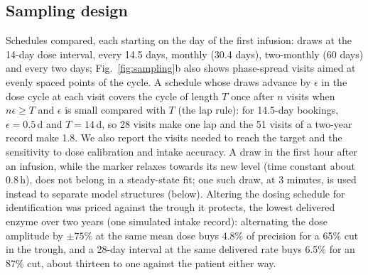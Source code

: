 \documentclass[11pt]{article}
\begin{document}
\subsection*{Sampling design}\label{sec:sampling}
Schedules compared, each starting on the day of the first infusion: draws at the 14-day dose
interval, every 14.5 days, monthly (30.4 days), two-monthly (60 days) and every two days;
Fig.~\ref{fig:sampling}b also shows phase-spread visits aimed at evenly spaced points of the cycle. A schedule whose draws advance by $\epsilon$ in the dose cycle at
each visit covers the cycle of length $T$ once after $n$ visits when $n\epsilon\ge T$ and $\epsilon$ is small compared with $T$ (the lap
rule): for 14.5-day bookings, $\epsilon=0.5$\,d and $T=14$\,d, so 28 visits make one lap and the
51 visits of a two-year record make 1.8. We also report the visits needed to reach the target and
the sensitivity to dose calibration and intake accuracy. A draw in the first hour after an infusion, while the marker relaxes towards its new level (time
constant about 0.8\,h), does not belong in a steady-state fit; one such draw, at 3 minutes, is used
instead to separate model structures (below). Altering the dosing schedule for identification was priced against the trough
it protects, the lowest delivered enzyme over two years (one simulated intake record): alternating the dose amplitude by $\pm75\%$ at the same mean dose buys 4.8\% of
precision for a 65\% cut in the trough, and a 28-day interval at the same delivered rate buys
6.5\% for an 87\% cut, about thirteen to one against the patient either way.
\end{document}
